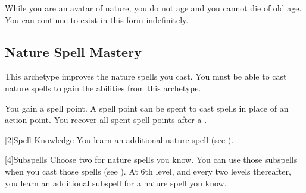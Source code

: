         While you are an avatar of nature, you do not age and you cannot die of old age.
        You can continue to exist in this form indefinitely.

    \subsection{Nature Spell Mastery}
        This archetype improves the nature spells you cast.
        You must be able to cast nature spells to gain the abilities from this archetype.

        You gain a spell point.
        A spell point can be spent to cast spells in place of an action point.
        You recover all spent spell points after a .

        [2]{Spell Knowledge} 
        You learn an additional nature spell (see ).

        [4]{Subspells}
        Choose two  for nature spells you know.
        You can use those subspells when you cast those spells (see ).
        At 6th level, and every two levels thereafter, you learn an additional subspell for a nature spell you know.

